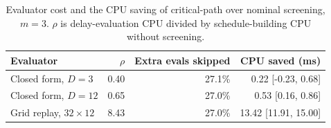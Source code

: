 \begin{table}[t]
\centering
\caption{Evaluator cost and the CPU saving of critical-path over nominal screening, $m=3$. $\rho$ is delay-evaluation CPU divided by schedule-building CPU without screening.}
\label{tab:cost}
\setlength{\tabcolsep}{3pt}\small
\begin{tabular}{lrrr}\toprule
Evaluator&$\rho$&Extra evals skipped&CPU saved (ms)\\\midrule
Closed form, $D{=}3$&0.40&27.1\%&0.22 [-0.23, 0.68]\\
Closed form, $D{=}12$&0.65&27.0\%&0.53 [0.16, 0.86]\\
Grid replay, $32\times12$&8.43&27.0\%&13.42 [11.91, 15.00]\\
\bottomrule\end{tabular}\end{table}
